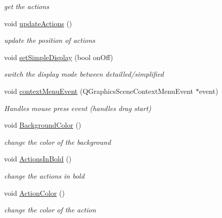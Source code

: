 \begin{DoxyCompactItemize}
\begin{DoxyCompactList}\small\item\em get the actions \end{DoxyCompactList}\item 
\hypertarget{classPHScene_a176668ca3774e8fec7ac7902e70c048e}{void \hyperlink{classPHScene_a176668ca3774e8fec7ac7902e70c048e}{update\+Actions} ()}\label{classPHScene_a176668ca3774e8fec7ac7902e70c048e}

\begin{DoxyCompactList}\small\item\em update the position of actions \end{DoxyCompactList}\item 
void \hyperlink{classPHScene_a4a99c9817b8ecbecf161e928d4e90984}{set\+Simple\+Display} (bool on\+Off)
\begin{DoxyCompactList}\small\item\em switch the display mode between detailled/simplified \end{DoxyCompactList}\item 
void \hyperlink{classPHScene_a9b080cb754ca9b12c2811d186e6f34b6}{context\+Menu\+Event} (Q\+Graphics\+Scene\+Context\+Menu\+Event $\ast$event)
\begin{DoxyCompactList}\small\item\em Handles mouse press event (handles drag start) \end{DoxyCompactList}\item 
\hypertarget{classPHScene_a865f5d4e8e1a62ea4cccc9a08761f3b7}{void \hyperlink{classPHScene_a865f5d4e8e1a62ea4cccc9a08761f3b7}{Background\+Color} ()}\label{classPHScene_a865f5d4e8e1a62ea4cccc9a08761f3b7}

\begin{DoxyCompactList}\small\item\em change the color of the background \end{DoxyCompactList}\item 
\hypertarget{classPHScene_ae49485e4ddf79c5d71aba4a4aebf147d}{void \hyperlink{classPHScene_ae49485e4ddf79c5d71aba4a4aebf147d}{Actions\+In\+Bold} ()}\label{classPHScene_ae49485e4ddf79c5d71aba4a4aebf147d}

\begin{DoxyCompactList}\small\item\em change the actions in bold \end{DoxyCompactList}\item 
\hypertarget{classPHScene_a648b16c898a66ac5e4a574e865617671}{void \hyperlink{classPHScene_a648b16c898a66ac5e4a574e865617671}{Action\+Color} ()}\label{classPHScene_a648b16c898a66ac5e4a574e865617671}

\begin{DoxyCompactList}\small\item\em change the color of the action \end{DoxyCompactList}\end{DoxyCompactItemize}
